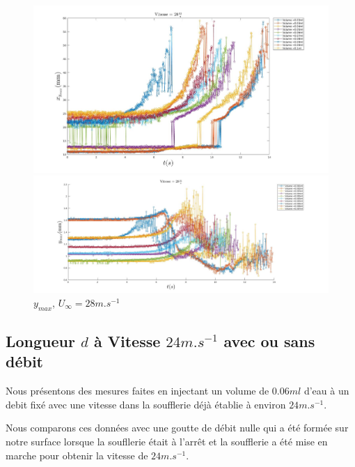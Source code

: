 \documentclass[french]{article}
\begin{document}
\begin{figure}[!h]
	\centering
	\begin{minipage}{0.7\linewidth}
	\includegraphics[width = \linewidth]{./image/v=28xm.jpg}
	\caption{$x_{max}$, $U_{\infty}=28m.s^{-1}$}
		\label{fig:v=28xm}
	\end{minipage}
	\begin{minipage}{0.7\linewidth}
	\includegraphics[width = \linewidth]{./image/v=28ym.jpg}
	\caption{$y_{max}$, $U_{\infty}=28m.s^{-1}$}
		\label{fig:v=28ym}
	\end{minipage}
\end{figure}

\subsection{Longueur $d$ à Vitesse $24m.s^{-1}$ avec ou sans débit}

Nous présentons des mesures faites en injectant un volume de $0.06ml$ d'eau  à un debit fixé avec une vitesse dans la soufflerie déjà établie à environ $24m.s^{-1}$.

Nous comparons ces données avec une goutte de débit nulle qui a été formée sur notre surface lorsque la soufllerie était à l'arrêt et la soufflerie a été mise en marche pour obtenir la vitesse de $24m.s^{-1}$.\\
\end{document}
